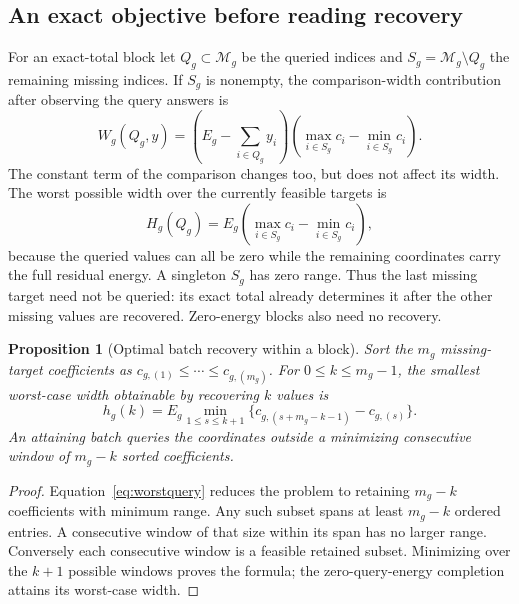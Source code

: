 \documentclass[12pt]{article}
\newtheorem{proposition}{Proposition}
\newcommand{\M}{\mathcal{M}}
\begin{document}
\subsection{An exact objective before reading recovery}
For an exact-total block let $Q_g\subset\M_g$ be the queried indices and
$S_g=\M_g\setminus Q_g$ the remaining missing indices. If $S_g$ is nonempty,
the comparison-width contribution after observing the query answers is
\begin{equation}
 W_g(Q_g,y)=\left(E_g-\sum_{i\in Q_g}y_i\right)
 \left(\max_{i\in S_g}c_i-\min_{i\in S_g}c_i\right).
 \label{eq:querywidth}
\end{equation}
The constant term of the comparison changes too, but does not affect its
width. The worst possible width over the currently feasible targets is
\begin{equation}
 H_g(Q_g)=E_g\left(\max_{i\in S_g}c_i-\min_{i\in S_g}c_i\right),
 \label{eq:worstquery}
\end{equation}
because the queried values can all be zero while the remaining coordinates
carry the full residual energy. A singleton $S_g$ has zero range. Thus the
last missing target need not be queried: its exact total already determines
it after the other missing values are recovered. Zero-energy blocks also
need no recovery.

\begin{proposition}[Optimal batch recovery within a block]
Sort the $m_g$ missing-target coefficients as
$c_{g,(1)}\leq\cdots\leq c_{g,(m_g)}$. For $0\leq k\leq m_g-1$, the
smallest worst-case width obtainable by recovering $k$ values is
\begin{equation}
 h_g(k)=E_g\min_{1\leq s\leq k+1}
 \{c_{g,(s+m_g-k-1)}-c_{g,(s)}\}.
 \label{eq:window}
\end{equation}
An attaining batch queries the coordinates outside a minimizing consecutive
window of $m_g-k$ sorted coefficients.
\end{proposition}
\begin{proof}
Equation~\eqref{eq:worstquery} reduces the problem to retaining $m_g-k$
coefficients with minimum range. Any such subset spans at least $m_g-k$
ordered entries. A consecutive window of that size within its span has no
larger range. Conversely each consecutive window is a feasible retained
subset. Minimizing over the $k+1$ possible windows proves the formula;
the zero-query-energy completion attains its worst-case width.
\end{proof}
\end{document}

